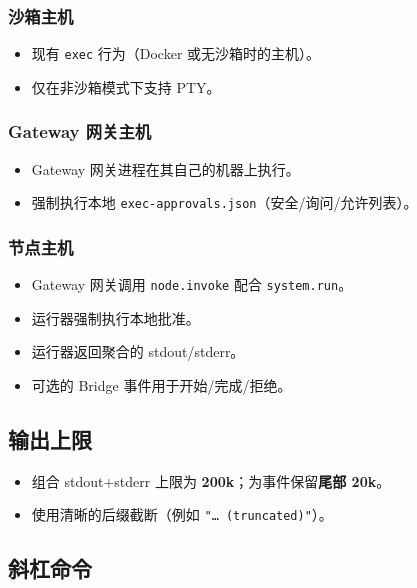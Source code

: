 \subsubsection{沙箱主机}


\begin{itemize}
  \item 现有 \texttt{exec} 行为（Docker 或无沙箱时的主机）。
  \item 仅在非沙箱模式下支持 PTY。
\end{itemize}


\subsubsection{Gateway 网关主机}


\begin{itemize}
  \item Gateway 网关进程在其自己的机器上执行。
  \item 强制执行本地 \texttt{exec-approvals.json}（安全/询问/允许列表）。
\end{itemize}


\subsubsection{节点主机}


\begin{itemize}
  \item Gateway 网关调用 \texttt{node.invoke} 配合 \texttt{system.run}。
  \item 运行器强制执行本地批准。
  \item 运行器返回聚合的 stdout/stderr。
  \item 可选的 Bridge 事件用于开始/完成/拒绝。
\end{itemize}


\subsection{输出上限}


\begin{itemize}
  \item 组合 stdout+stderr 上限为 \textbf{200k}；为事件保留\textbf{尾部 20k}。
  \item 使用清晰的后缀截断（例如 \texttt{"… (truncated)"}）。
\end{itemize}


\subsection{斜杠命令}


